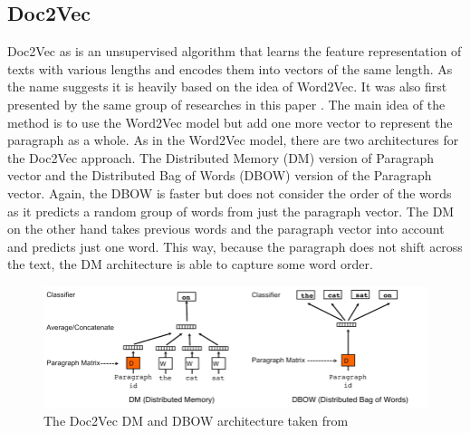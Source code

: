 \subsection{Doc2Vec}
Doc2Vec as is an unsupervised algorithm that learns the feature representation of texts with various lengths and encodes them into vectors of the same length. As the name suggests it is heavily based on the idea of Word2Vec. It was also first presented by the same group of researches in this paper \cite{DBLP:journals/corr/LeM14}. The main idea of the method is to use the Word2Vec model but add one more vector to represent the paragraph as a whole. As in the Word2Vec model, there are two architectures for the Doc2Vec approach. The Distributed Memory (DM) version of Paragraph vector and the Distributed Bag of Words (DBOW) version of the Paragraph vector. Again, the DBOW is faster but does not consider the order of the words as it predicts a random group of words from just the paragraph vector. The DM on the other hand takes previous words and the paragraph vector into account and predicts just one word. This way, because the paragraph does not shift across the text, the DM architecture is able to capture some word order.
\begin{figure}[h]
    \centering
	\includegraphics[width=140mm]{./img/DV_DBOW_doc2vec_architectures.png}
	\caption{The Doc2Vec DM and DBOW architecture taken from \cite{DBLP:journals/corr/LeM14}}
	\label{fig:dbow_dm_d2v_architecture}
\end{figure}
